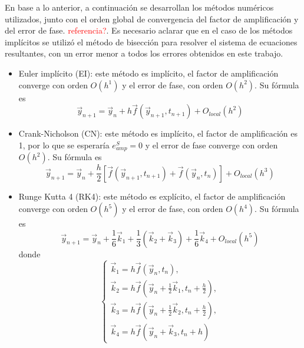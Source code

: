 \documentclass[aps,prb,twocolumn,superscriptaddress,floatfix,longbibliography]{revtex4-2}
\newcounter{para}
\begin{document}
En base a lo anterior, a continuación se desarrollan los métodos numéricos utilizados, junto con el orden global de convergencia del factor de amplificación  y del error de fase. \textcolor{red}{referencia?}. Es necesario aclarar que en el caso de los métodos implícitos se utilizó el método de bisección para resolver el sistema de ecuaciones resultantes, con un error menor a todos los errores obtenidos en este trabajo.
\begin{itemize}
  \item Euler implícito (EI): este método es implícito, el factor de amplificación converge con orden $O(h^1)$ y el error de fase, con orden $O(h^2)$. Su fórmula es
  \begin{equation}
    \vec{y}_{n+1} = \vec{y}_n + h \vec{f}(\vec{y}_{n+1}, t_{n+1}) + O_{local}(h^2)
    \label{eq:Euler_implicito}
  \end{equation}

  \item Crank-Nicholson (CN): este método es implícito, el factor de amplificación es 1, por lo que se esperaría $e^S_{amp} = 0$ y el error de fase converge con orden $O(h^2)$. Su fórmula es
  \begin{equation}
    \vec{y}_{n+1} = \vec{y}_n + \frac{h}{2} [ \vec{f}(\vec{y}_{n+1}, t_{n+1}) + \vec{f}(\vec{y}_{n}, t_{n}) ]+ O_{local}(h^3)
    \label{eq:Crank_Nicholson}
  \end{equation}

  \item Runge Kutta 4 (RK4): este método es explícito, el factor de amplificación converge con orden $O(h^5)$ y el error de fase, con orden $O(h^4)$. Su fórmula es
  \begin{equation}
    \vec{y}_{n+1} = \vec{y}_n + \frac{1}{6} \vec{k}_1 + \frac{1}{3} (\vec{k}_2 + \vec{k}_3) + \frac{1}{6} \vec{k}_4 + O_{local}(h^5)
    \label{eq:Runge_Kutta_4}
  \end{equation}
  donde
  \[
    \left\{\begin{matrix}
      \vec{k}_1 = h \vec{f}(\vec{y}_n, t_n), \\ 
      \vec{k}_2 = h \vec{f} \left( \vec{y}_n + \frac{1}{2} \vec{k}_1 , t_n + \frac{h}{2}\right), \\
      \vec{k}_3 = h \vec{f} \left ( \vec{y}_n + \frac{1}{2} \vec{k}_2 , t_n + \frac{h}{2}  \right ), \\
      \vec{k}_4 = h \vec{f}(\vec{y}_n + \vec{k}_3, t_n + h)
    \end{matrix}\right.
  \]


\end{itemize}
\end{document}
